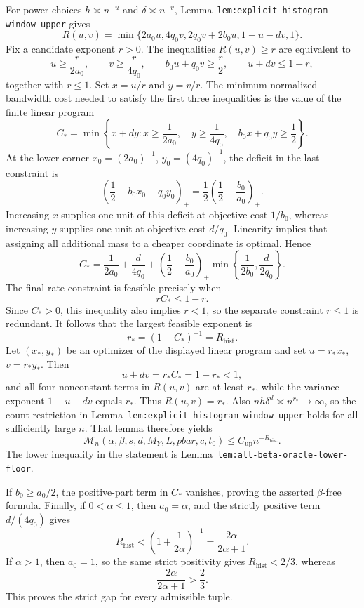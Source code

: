 For power choices \(h\asymp n^{-u}\) and \(\delta\asymp n^{-v}\), Lemma~\texttt{lem:explicit-histogram-window-upper} gives
\[
R(u,v)=\min\{2a_0u,4q_0v,2q_0v+2b_0u,1-u-dv,1\}.
\]
Fix a candidate exponent \(r>0\). The inequalities \(R(u,v)\ge r\) are equivalent to
\[
u\ge\frac{r}{2a_0},\qquad
v\ge\frac{r}{4q_0},\qquad
b_0u+q_0v\ge\frac r2,
\qquad
u+dv\le1-r,
\]
together with \(r\le1\). Set \(x=u/r\) and \(y=v/r\). The minimum normalized bandwidth cost needed to satisfy the first three inequalities is the value of the finite linear program
\[
C_*=\min\left\{x+dy:
 x\ge\frac{1}{2a_0},\quad
 y\ge\frac{1}{4q_0},\quad
 b_0x+q_0y\ge\frac12
\right\}.
\]
At the lower corner \(x_0=(2a_0)^{-1}\), \(y_0=(4q_0)^{-1}\), the deficit in the last constraint is
\[
\left(\frac12-b_0x_0-q_0y_0\right)_+
=
\frac12\left(\frac12-\frac{b_0}{a_0}\right)_+.
\]
Increasing \(x\) supplies one unit of this deficit at objective cost \(1/b_0\), whereas increasing \(y\) supplies one unit at objective cost \(d/q_0\). Linearity implies that assigning all additional mass to a cheaper coordinate is optimal. Hence
\[
C_*=\frac{1}{2a_0}+\frac{d}{4q_0}
+\left(\frac12-\frac{b_0}{a_0}\right)_+
\min\left\{\frac{1}{2b_0},\frac{d}{2q_0}\right\}.
\]
The final rate constraint is feasible precisely when
\[
rC_*\le1-r.
\]
Since \(C_*>0\), this inequality also implies \(r<1\), so the separate constraint \(r\le1\) is redundant. It follows that the largest feasible exponent is
\[
r_*=(1+C_*)^{-1}=R_{\mathrm{hist}}.
\]
Let \((x_*,y_*)\) be an optimizer of the displayed linear program and set \(u=r_*x_*\), \(v=r_*y_*\). Then
\[
u+dv=r_*C_*=1-r_*<1,
\]
and all four nonconstant terms in \(R(u,v)\) are at least \(r_*\), while the variance exponent \(1-u-dv\) equals \(r_*\). Thus \(R(u,v)=r_*\). Also \(nh\delta^d\asymp n^{r_*}\to\infty\), so the count restriction in Lemma~\texttt{lem:explicit-histogram-window-upper} holds for all sufficiently large \(n\). That lemma therefore yields
\[
\mathcal M_n(\alpha,\beta,s,d,M_Y,L,pbar,c,t_0)
\le C_{\mathrm{up}}n^{-R_{\mathrm{hist}}}.
\]
The lower inequality in the statement is Lemma~\texttt{lem:all-beta-oracle-lower-floor}.

If \(b_0\ge a_0/2\), the positive-part term in \(C_*\) vanishes, proving the asserted \(\beta\)-free formula. Finally, if \(0<\alpha\le1\), then \(a_0=\alpha\), and the strictly positive term \(d/(4q_0)\) gives
\[
R_{\mathrm{hist}}
<
\left(1+\frac{1}{2\alpha}\right)^{-1}
=
\frac{2\alpha}{2\alpha+1}.
\]
If \(\alpha>1\), then \(a_0=1\), so the same strict positivity gives \(R_{\mathrm{hist}}<2/3\), whereas
\[
\frac{2\alpha}{2\alpha+1}>\frac23.
\]
This proves the strict gap for every admissible tuple.